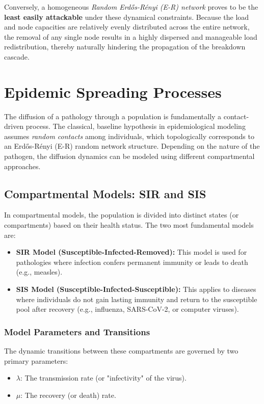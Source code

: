 Conversely, a homogeneous \textit{Random Erdős-Rényi (E-R) network} proves to be the \textbf{least easily attackable} under these dynamical constraints. Because the load and node capacities are relatively evenly distributed across the entire network, the removal of any single node results in a highly dispersed and manageable load redistribution, thereby naturally hindering the propagation of the breakdown cascade.

\section{Epidemic Spreading Processes}
\label{sec:epidemics}

The diffusion of a pathology through a population is fundamentally a contact-driven process. The classical, baseline hypothesis in epidemiological modeling assumes \textit{random contacts} among individuals, which topologically corresponds to an Erdős-Rényi (E-R) random network structure. Depending on the nature of the pathogen, the diffusion dynamics can be modeled using different compartmental approaches.

\subsection{Compartmental Models: SIR and SIS}
\label{subsec:compartmental_models}

In compartmental models, the population is divided into distinct states (or compartments) based on their health status. The two most fundamental models are:
\begin{itemize}
    \item \textbf{SIR Model (Susceptible-Infected-Removed):} This model is used for pathologies where infection confers permanent immunity or leads to death (e.g., measles).
    \item \textbf{SIS Model (Susceptible-Infected-Susceptible):} This applies to diseases where individuals do not gain lasting immunity and return to the susceptible pool after recovery (e.g., influenza, SARS-CoV-2, or computer viruses).
\end{itemize}

\subsubsection{Model Parameters and Transitions}

The dynamic transitions between these compartments are governed by two primary parameters:
\begin{itemize}
    \item \(\lambda\): The transmission rate (or "infectivity" of the virus).
    \item \(\mu\): The recovery (or death) rate.
\end{itemize}


